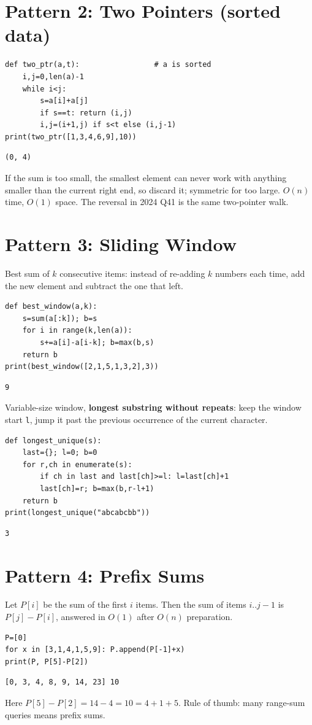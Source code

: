 \documentclass[11pt,a4paper]{article}
\newcommand{\py}[1]{\texttt{#1}}
\begin{document}
\section{Pattern 2: Two Pointers (sorted data)}
\begin{lstlisting}
def two_ptr(a,t):                 # a is sorted
    i,j=0,len(a)-1
    while i<j:
        s=a[i]+a[j]
        if s==t: return (i,j)
        i,j=(i+1,j) if s<t else (i,j-1)
print(two_ptr([1,3,4,6,9],10))
\end{lstlisting}
\begin{lstlisting}[style=out]
(0, 4)
\end{lstlisting}
If the sum is too small, the smallest element can never work with anything smaller than the current right end, so discard it; symmetric for too large. $O(n)$ time, $O(1)$ space. The reversal in 2024 Q41 is the same two-pointer walk.

\section{Pattern 3: Sliding Window}
Best sum of $k$ consecutive items: instead of re-adding $k$ numbers each time, add the new element and subtract the one that left.
\begin{lstlisting}
def best_window(a,k):
    s=sum(a[:k]); b=s
    for i in range(k,len(a)):
        s+=a[i]-a[i-k]; b=max(b,s)
    return b
print(best_window([2,1,5,1,3,2],3))
\end{lstlisting}
\begin{lstlisting}[style=out]
9
\end{lstlisting}
Variable-size window, \textbf{longest substring without repeats}: keep the window start \py{l}, jump it past the previous occurrence of the current character.
\begin{lstlisting}
def longest_unique(s):
    last={}; l=0; b=0
    for r,ch in enumerate(s):
        if ch in last and last[ch]>=l: l=last[ch]+1
        last[ch]=r; b=max(b,r-l+1)
    return b
print(longest_unique("abcabcbb"))
\end{lstlisting}
\begin{lstlisting}[style=out]
3
\end{lstlisting}

\section{Pattern 4: Prefix Sums}
Let $P[i]$ be the sum of the first $i$ items. Then the sum of items $i..j-1$ is $P[j]-P[i]$, answered in $O(1)$ after $O(n)$ preparation.
\begin{lstlisting}
P=[0]
for x in [3,1,4,1,5,9]: P.append(P[-1]+x)
print(P, P[5]-P[2])
\end{lstlisting}
\begin{lstlisting}[style=out]
[0, 3, 4, 8, 9, 14, 23] 10
\end{lstlisting}
Here $P[5]-P[2]=14-4=10=4+1+5$. Rule of thumb: many range-sum queries means prefix sums.
\end{document}

